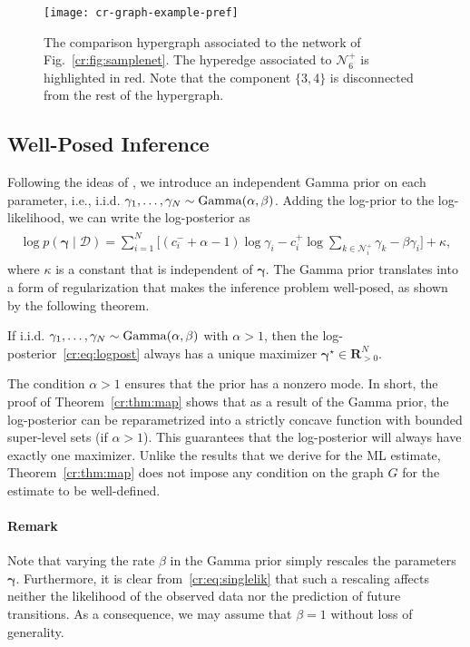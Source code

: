 \begin{figure}[t]
  \centering
  \texttt{[image: cr-graph-example-pref]}
  \caption{The comparison hypergraph associated to the network of Fig.~\ref{cr:fig:samplenet}.
The hyperedge associated to $\mathcal{N}^+_6$ is highlighted in red.
Note that the component $\{3, 4\}$ is disconnected from the rest of the hypergraph.}
  \label{cr:fig:samplehyp}
\end{figure}


\subsection{Well-Posed Inference}

Following the ideas of \citet{caron2012efficient}, we introduce an independent Gamma prior on each parameter, i.e., i.i.d. $\gamma_1, \ldots, \gamma_N \sim \mathrm{Gamma}( \alpha, \beta )$.
Adding the log-prior to the log-likelihood, we can write the log-posterior as
\begin{align}
\begin{aligned}
\label{cr:eq:logpost}
\log p(\bm{\gamma} \mid \mathcal{D}) = \sum_{i = 1}^N
  \bigg[ (c^-_i + \alpha - 1) \log \gamma_i
        - c^+_i \log\!\sum_{k \in \mathcal{N}^+_i}\!\gamma_k  - \beta \gamma_i \bigg] + \kappa,
\end{aligned}
\end{align}
where $\kappa$ is a constant that is independent of $\bm{\gamma}$.
The Gamma prior translates into a form of regularization that makes the inference problem well-posed, as shown by the following theorem.

\begin{theorem}
\label{cr:thm:map}
If i.i.d. $\gamma_1, \ldots, \gamma_N \sim \mathrm{Gamma}( \alpha, \beta )$ with $\alpha > 1$, then the log-posterior~\eqref{cr:eq:logpost} always has a unique maximizer $\bm{\gamma}^\star \in \mathbf{R}^N_{>0}$.
\end{theorem}

The condition $\alpha > 1$ ensures that the prior has a nonzero mode.
In short, the proof of Theorem~\ref{cr:thm:map} shows that as a result of the Gamma prior, the log-posterior can be reparametrized into a strictly concave function with bounded super-level sets (if $\alpha > 1$).
This guarantees that the log-posterior will always have exactly one maximizer.
Unlike the results that we derive for the ML estimate, Theorem~\ref{cr:thm:map} does not impose any condition on the graph $G$ for the estimate to be well-defined.

\paragraph{Remark}
Note that varying the rate $\beta$ in the Gamma prior simply rescales the parameters $\bm{\gamma}$.
Furthermore, it is clear from~\eqref{cr:eq:singlelik} that such a rescaling affects neither the likelihood of the observed data nor the prediction of future transitions.
As a consequence, we may assume that $\beta = 1$ without loss of generality.
